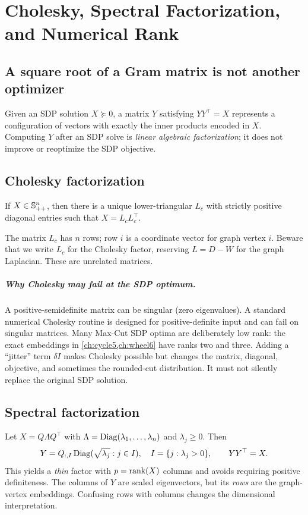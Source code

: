 \chapter{Cholesky, Spectral Factorization, and Numerical Rank}\label{ch:factorization}
\section{A square root of a Gram matrix is not another optimizer}
Given an SDP solution $X\succeq0$, a matrix $Y$ satisfying $YY^\top=X$ represents a configuration of vectors with exactly the inner products encoded in $X$. Computing $Y$ after an SDP solve is \emph{linear algebraic factorization}; it does not improve or reoptimize the SDP objective.

\section{Cholesky factorization}
\begin{theorem}
If $X\in\mathbb{S}_{++}^n$, then there is a unique lower-triangular $L_c$ with strictly positive diagonal entries such that $X=L_cL_c^\top$.
\end{theorem}
The matrix $L_c$ has $n$ rows; row $i$ is a coordinate vector for graph vertex $i$. Beware that we write $L_c$ for the Cholesky factor, reserving $L=D-W$ for the graph Laplacian. These are unrelated matrices.

\paragraph{Why Cholesky may fail at the SDP optimum.} A positive-semidefinite matrix can be singular (zero eigenvalues). A standard numerical Cholesky routine is designed for positive-definite input and can fail on singular matrices. Many Max-Cut SDP optima are deliberately low rank: the exact embeddings in \cref{ch:cycle5,ch:wheel6} have ranks two and three. Adding a ``jitter'' term $\delta I$ makes Cholesky possible but changes the matrix, diagonal, objective, and sometimes the rounded-cut distribution. It must not silently replace the original SDP solution.

\section{Spectral factorization}
Let $X=Q\Lambda Q^\top$ with $\Lambda=\operatorname{Diag}(\lambda_1,\ldots,\lambda_n)$ and $\lambda_j\ge0$. Then
\begin{equation}\label{eq:eigfactor}
Y=Q_{:,I}\operatorname{Diag}(\sqrt{\lambda_j}:j\in I),\quad I=\{j:\lambda_j>0\},\qquad YY^\top=X.
\end{equation}
This yields a \emph{thin} factor with $p=\operatorname{rank}(X)$ columns and avoids requiring positive definiteness. The columns of $Y$ are scaled eigenvectors, but its \emph{rows} are the graph-vertex embeddings. Confusing rows with columns changes the dimensional interpretation.

